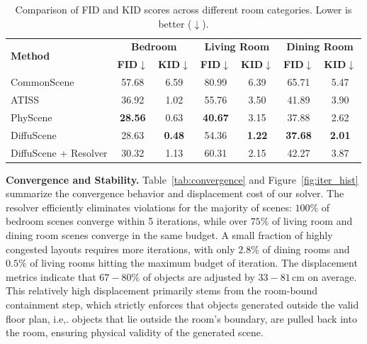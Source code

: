 \begin{table}[t]
\centering
\small
\setlength{\tabcolsep}{5pt}
\caption{Comparison of FID and KID scores across different room categories. Lower is better ($\downarrow$).}
\label{tab:fidkid}
\begin{tabular}{|l|cc|cc|cc|}
\hline
\multirow{2}{*}{\textbf{Method}} 
& \multicolumn{2}{c|}{\textbf{Bedroom}}
& \multicolumn{2}{c|}{\textbf{Living Room}}
& \multicolumn{2}{c|}{\textbf{Dining Room}} \\
& \textbf{FID}$\downarrow$ & \textbf{KID}$\downarrow$
& \textbf{FID}$\downarrow$ & \textbf{KID}$\downarrow$
& \textbf{FID}$\downarrow$ & \textbf{KID}$\downarrow$ \\
\hline

CommonScene
& 57.68 & 6.59
& 80.99 & 6.39
& 65.71 & 5.47 \\
ATISS
& 36.92 & 1.02
& 55.76 & 3.50
& 41.89 & 3.90 \\

PhyScene
& \textbf{28.56} & 0.63
& \textbf{40.67} & 3.15
& 37.88 & 2.62 \\



DiffuScene
& 28.63 & \textbf{0.48}
& 54.36 & \textbf{1.22}
& \textbf{37.68} & \textbf{2.01} \\

\hline
DiffuScene + Resolver
& 30.32 & 1.13
& 60.31 & 2.15
& 42.27 & 3.87 \\

\hline
\end{tabular}
\end{table}


\textbf{Convergence and Stability.} 
Table~\ref{tab:convergence} and Figure~\ref{fig:iter_hist} summarize the convergence behavior and displacement cost of our solver. The resolver efficiently eliminates violations for the majority of scenes: $100\%$ of bedroom scenes converge within 5 iterations, while over $75\%$ of living room and dining room scenes converge in the same budget. A small fraction of highly congested layouts requires more iterations, with only $2.8\%$ of dining rooms and $0.5\%$ of living rooms hitting the maximum budget of iteration. The displacement metrics indicate that $67-80\%$ of objects are adjusted by $33-81$\,cm on average. This relatively high displacement primarily stems from the room-bound containment step, which strictly enforces that objects generated outside the valid floor plan, i.e,. objects that lie outside the room's boundary, are pulled back into the room, ensuring physical validity of the generated scene.


